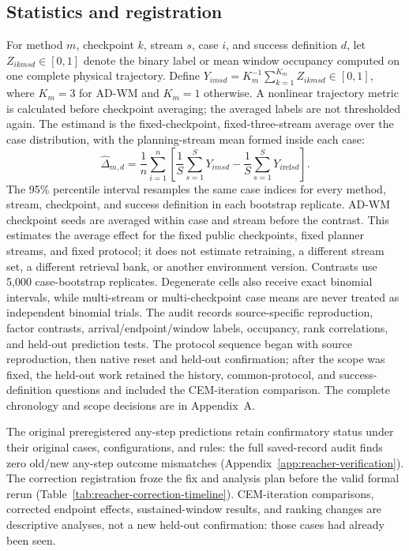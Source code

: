 \documentclass[manuscript,screen,review]{jair}
\begin{document}
\subsection{Statistics and registration}
For method $m$, checkpoint $k$, stream $s$, case $i$, and success definition $d$, let $Z_{ikmsd}\in[0,1]$ denote the binary label or mean window occupancy computed on one complete physical trajectory. Define $Y_{imsd}=K_m^{-1}\sum_{k=1}^{K_m}Z_{ikmsd}\in[0,1]$, where $K_m=3$ for AD-WM and $K_m=1$ otherwise. A nonlinear trajectory metric is calculated before checkpoint averaging; the averaged labels are not thresholded again. The estimand is the fixed-checkpoint, fixed-three-stream average over the case distribution, with the planning-stream mean formed inside each case:
\[
\widehat{\Delta}_{m,d}=\frac{1}{n}\sum_{i=1}^{n}\left[\frac{1}{S}\sum_{s=1}^{S}Y_{imsd}-\frac{1}{S}\sum_{s=1}^{S}Y_{i\mathrm{ref}sd}\right].
\]
The 95\% percentile interval resamples the same case indices for every method, stream, checkpoint, and success definition in each bootstrap replicate. AD-WM checkpoint seeds are averaged within case and stream before the contrast. This estimates the average effect for the fixed public checkpoints, fixed planner streams, and fixed protocol; it does not estimate retraining, a different stream set, a different retrieval bank, or another environment version. Contrasts use 5,000 case-bootstrap replicates. Degenerate cells also receive exact binomial intervals, while multi-stream or multi-checkpoint case means are never treated as independent binomial trials. The audit records source-specific reproduction, factor contrasts, arrival/endpoint/window labels, occupancy, rank correlations, and held-out prediction tests. The protocol sequence began with source reproduction, then native reset and held-out confirmation; after the scope was fixed, the held-out work retained the history, common-protocol, and success-definition questions and included the CEM-iteration comparison. The complete chronology and scope decisions are in Appendix~A.

The original preregistered any-step predictions retain confirmatory status under their original cases, configurations, and rules: the full saved-record audit finds zero old/new any-step outcome mismatches (Appendix~\ref{app:reacher-verification}). The correction registration froze the fix and analysis plan before the valid formal rerun (Table~\ref{tab:reacher-correction-timeline}). CEM-iteration comparisons, corrected endpoint effects, sustained-window results, and ranking changes are descriptive analyses, not a new held-out confirmation: those cases had already been seen.
\end{document}
